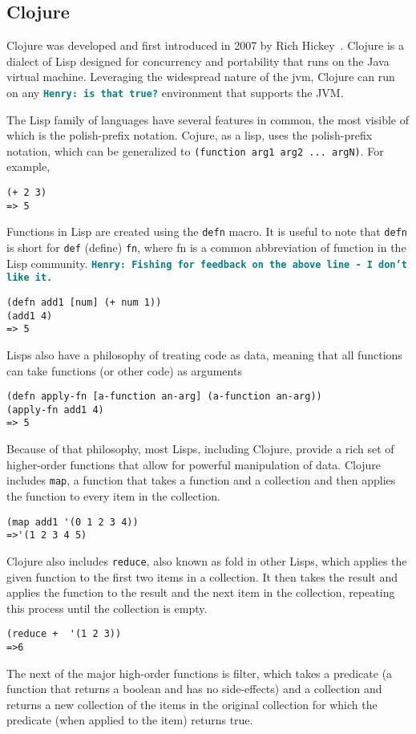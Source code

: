 \documentclass[12pt]{article}
\newcommand{\comment}[1]{{\bf \tt  {#1}}}
\newcommand{\hfcomment}[1]{\textcolor{Teal}{\comment{Henry: {#1}}}}
\newcommand{\clocode}[1]{{\texttt {#1}}}
\begin{document}
\subsection{Clojure}\label{sec:clojure}
Clojure was developed and first introduced in 2007 by Rich Hickey~\cite{Hickey:2008}. Clojure is a dialect of Lisp designed for concurrency and portability that runs on the Java virtual machine. Leveraging the widespread nature of the jvm, Clojure can run on any \hfcomment{is that true?} environment that supports the JVM. 

The Lisp family of languages have several features in common, the most visible of which is the polish-prefix notation. Cojure, as a lisp, uses the polish-prefix notation, which can be generalized to \clocode{(function arg1 arg2 ... argN)}. For example, 
\begin{verbatim}
(+ 2 3)
=> 5
\end{verbatim}
Functions in Lisp are created using the \clocode{defn} macro. It is useful to note that \clocode{defn} is short for \clocode{def} (define) \clocode{fn}, where fn is a common abbreviation of function in the Lisp community.
\hfcomment{Fishing for feedback on the above line - I don't like it.}
\begin{verbatim}
(defn add1 [num] (+ num 1))
(add1 4)
=> 5
\end{verbatim}
 Lisps also have a philosophy of treating code as data, meaning that all functions can take functions (or other code) as arguments
\begin{verbatim}
(defn apply-fn [a-function an-arg] (a-function an-arg))
(apply-fn add1 4)
=> 5
\end{verbatim}
Because of that philosophy, most Lisps, including Clojure, provide a rich set of higher-order functions that allow for powerful manipulation of data. Clojure includes \clocode{map}, a function that takes a function and a collection and then applies the function to every item in the collection.
\begin{verbatim}
(map add1 '(0 1 2 3 4))
=>'(1 2 3 4 5)
\end{verbatim}
Clojure also includes \clocode{reduce}, also known as fold in other Lisps, which applies the given function to the first two items in a collection. It then takes the result and applies the function to the result and the next item in the collection, repeating this process until the collection is empty.
\begin{verbatim}
(reduce +  '(1 2 3))
=>6
\end{verbatim}
The next of the major high-order functions is filter, which takes a predicate (a function that returns a boolean and has no side-effects) and a collection and returns a new collection of the items in the original collection for which the predicate (when applied to the item) returns true.
\end{document}
